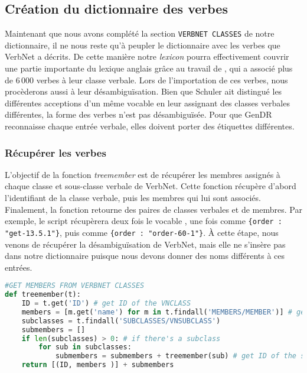 
\subsection{Création du dictionnaire des verbes} \label{extracmembre}

Maintenant que nous avons complété la section \texttt{VERBNET CLASSES} de notre dictionnaire, il ne nous reste qu'à peupler le dictionnaire avec les verbes que VerbNet a décrits. De cette manière notre \emph{lexicon} pourra effectivement couvrir une partie importante du lexique anglais grâce au travail de \cite{SchulerVerbnetBroadcoverageComprehensive2005}, qui a associé plus de 6\,000 verbes à leur classe verbale. Lors de l'importation de ces verbes, nous procèderons aussi à leur désambiguïsation. Bien que Schuler ait distingué les différentes acceptions d'un même vocable en leur assignant des classes verbales différentes, la forme des verbes n'est pas désambiguïsée. Pour que GenDR reconnaisse chaque entrée verbale, elles doivent porter des étiquettes différentes.

\subsubsection{Récupérer les verbes}
L'objectif de la fonction \emph{treemember} est de récupérer les membres assignés à chaque classe et sous-classe verbale de VerbNet. Cette fonction récupère d'abord l'identifiant de la classe verbale, puis les membres qui lui sont associés. Finalement, la fonction retourne des paires de classes verbales et de membres. Par exemple, le script récupèrera deux fois le vocable , une fois comme \lstinline|{order : "get-13.5.1"}|, puis comme \lstinline|{order : "order-60-1"}|. À cette étape, nous venons de récupérer la désambiguïsation de VerbNet, mais elle ne s'insère pas dans notre dictionnaire puisque nous devons donner des noms différents à ces entrées.

\begin{lstlisting}[language=Python, caption = Importation des verbes de VerbNet, label=fig:scriptmember-bloc1]
#GET MEMBERS FROM VERBNET CLASSES
def treemember(t):
    ID = t.get('ID') # get ID of the VNCLASS
    members = [m.get('name') for m in t.findall('MEMBERS/MEMBER')] # get members 
    subclasses = t.findall('SUBCLASSES/VNSUBCLASS')
    submembers = []
    if len(subclasses) > 0: # if there's a subclass
        for sub in subclasses:
            submembers = submembers + treemember(sub) # get ID of the subclass and members
    return [(ID, members )] + submembers
\end{lstlisting}

